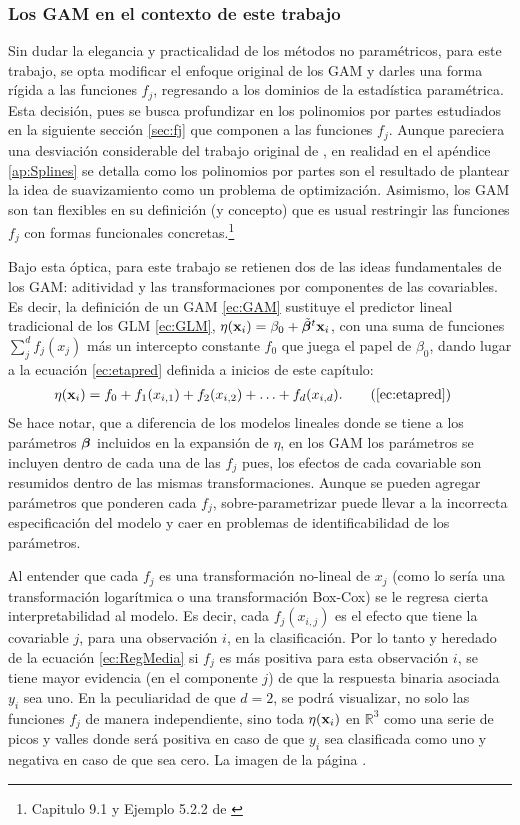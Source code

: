 \documentclass[../Main/Main.tex]{subfiles}
\begin{document}
\subsubsection*{Los GAM en el contexto de este trabajo}
Sin dudar la elegancia y practicalidad de los métodos no paramétricos, para este trabajo, se opta modificar el enfoque original de los GAM y darles una forma rígida a las funciones $f_j$, regresando a los dominios de la estadística paramétrica. Esta decisión, pues se busca profundizar en los polinomios por partes estudiados en la siguiente sección \ref{sec:fj} que componen a las funciones $f_j$. Aunque pareciera una desviación considerable del trabajo original de \citeauthor{hastie1990generalized}, en realidad en el apéndice \ref{ap:Splines} se detalla como los polinomios por partes son el resultado de plantear la idea de suavizamiento como un problema de optimización. Asimismo, los GAM son tan flexibles en su definición (y concepto) que es usual restringir las funciones $f_j$ con formas funcionales concretas.\footnote{Capitulo 9.1 y Ejemplo 5.2.2 de \citet{hastie2008elements}}

Bajo esta óptica, para este trabajo se retienen dos de las ideas fundamentales de los GAM: aditividad y las transformaciones por componentes de las covariables. Es decir, la definición de un GAM \eqref{ec:GAM} sustituye el predictor lineal tradicional de los GLM \eqref{ec:GLM}, $\eta(\mathbf{x}_i) = \beta_0 + \tilde{\bm{\beta}}^t\mathbf{x}_i$, con una suma de funciones $\sum_j^d f_j(x_j)$ más un intercepto constante $f_0$ que juega el papel de $\beta_0$, dando lugar a la ecuación \eqref{ec:etapred} definida a inicios de este capítulo:
\begin{align}
\eta(\xni) &= f_0 + f_1(x_{i,1}) + f_2(x_{i,2}) + \ldots + f_d(x_{i,d}). \tag{\ref{ec:etapred}}
\end{align}
Se hace notar, que a diferencia de los modelos lineales donde se tiene a los parámetros $\bm{\beta}$ incluidos en la expansión de $\eta$,  en los GAM los parámetros se incluyen dentro de cada una de las $f_j$ pues, los efectos de cada covariable son resumidos dentro de las mismas transformaciones. Aunque se pueden agregar parámetros que ponderen cada $f_j$, sobre-parametrizar puede llevar a la incorrecta especificación del modelo y caer en problemas de identificabilidad de los parámetros.

Al entender que cada $f_j$ es una transformación no-lineal de $x_j$ (como lo sería una transformación logarítmica o una transformación Box-Cox) se le regresa cierta interpretabilidad al modelo. Es decir, cada $f_j(x_{i,j})$ es el efecto que tiene la covariable $j$, para una observación $i$, en la clasificación. Por lo tanto y heredado de la ecuación \eqref{ec:RegMedia} si $f_j$ es más positiva para esta observación $i$, se tiene mayor evidencia (en el componente $j$) de que la respuesta binaria asociada $y_i$ sea uno. En la peculiaridad de que $d = 2$, se podrá visualizar, no solo las funciones $f_j$ de manera independiente, sino toda $\eta(\mathbf{x}_i)$ en $\mathbb{R}^3$ como una serie de picos y valles donde será positiva en caso de que $y_i $ sea clasificada como uno y  negativa en caso de que sea cero. La imagen de la página \pageref{fig:YY3D}.
\end{document}
